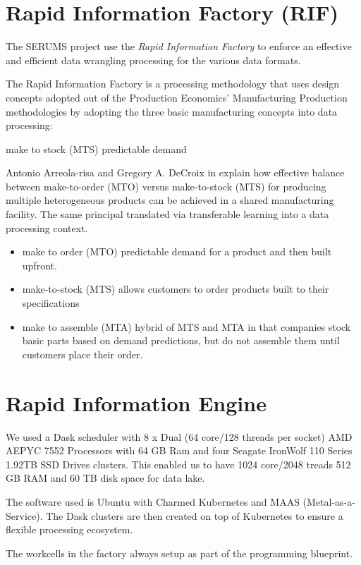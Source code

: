 \section{Rapid Information Factory (RIF)}

The SERUMS project use the \emph{Rapid Information Factory} to enforce an effective and efficient data wrangling processing for the various data formats.

The Rapid Information Factory is a processing methodology that uses design concepts adopted out of the Production Economics' Manufacturing Production methodologies by adopting the three basic manufacturing concepts into data processing:

make to stock (MTS)
predictable demand

Antonio Arreola-risa and Gregory A. DeCroix in \cite{Arreola-Risa1998} explain how effective balance between make-to-order (MTO) versus make-to-stock (MTS) for producing multiple heterogeneous products can be achieved in a shared manufacturing facility. The same principal translated via transferable learning into a data processing context. 

\begin{itemize}
    \item make to order (MTO) predictable demand for a product and then built upfront.
    \item make-to-stock (MTS) allows customers to order products built to their specifications
    \item make to assemble (MTA) hybrid of MTS and MTA in that companies stock basic parts based on demand predictions, but do not assemble them until customers place their order. 
\end{itemize}

\section{Rapid Information Engine}

We used a Dask scheduler with 8 x Dual (64 core/128 threads per socket) AMD AEPYC 7552 Processors with 64 GB Ram and four Seagate IronWolf 110 Series 1.92TB SSD Drives clusters. This enabled us to have 1024 core/2048 treads 512 GB RAM and 60 TB disk space for data lake.

The software used is Ubuntu with Charmed Kubernetes and MAAS (Metal-as-a-Service). The Dask clusters are then created on top of Kubernetes to ensure a flexible processing ecosystem.

The workcells in the factory always setup as part of the programming blueprint.



